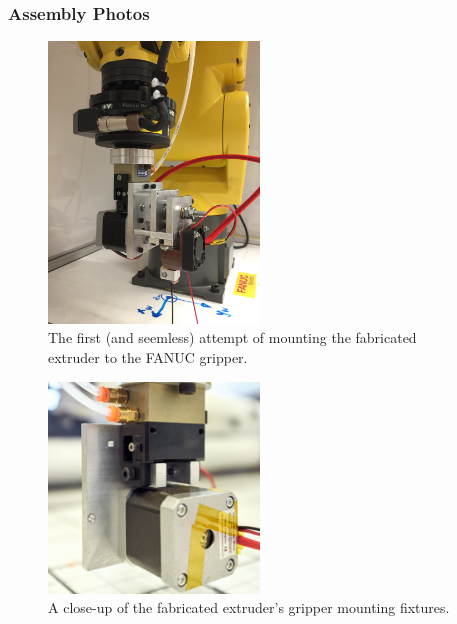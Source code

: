 \clearpage

\subsubsection{Assembly Photos}


\indent

\begin{figure}[h!]
\centering
\includegraphics[width=0.5\textwidth]{./figures/extruder-first-mount}
\caption{The first (and seemless) attempt of mounting the fabricated extruder to the FANUC gripper.}
\label{fig:extruder-first-mount}
\end{figure}

\begin{figure}[h!]
\centering
\includegraphics[width=0.5\textwidth]{./figures/extruder-mounting}
\caption{A close-up of the fabricated extruder's gripper mounting fixtures.}
\label{fig:extruder-mounting}
\end{figure}

